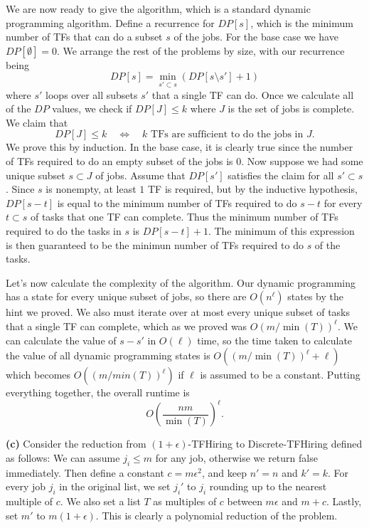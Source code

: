 \documentclass[11pt,letterpaper]{article}
\begin{document}
\begin{solution}
    We are now ready to give the algorithm, which is a standard dynamic programming algorithm. Define a recurrence for $DP[s]$, which is the minimum number of TFs that can do a subset $s$ of the jobs. For the base case we have $DP[\emptyset]=0$. We arrange the rest of the problems by size, with our recurrence being
    \[
        DP[s]=\min_{s'\subset s}(DP[s\setminus s']+1)
    \] 
    where $s'$ loops over all subsets $s'$ that a single TF can do. Once we calculate all of the $DP$ values, we check if $DP[J]\leq k$ where $J$ is the set of jobs is complete. We claim that 
    \[
        DP[J]\leq k \quad\Longleftrightarrow\quad k \textrm{ TFs are sufficient to do the jobs in } J.
    \] 
    We prove this by induction. In the base case, it is clearly true since the number of TFs required to do an empty subset of the jobs is $0$. Now suppose we had some unique subset $s\subset J$ of jobs. Assume that $DP[s']$ satisfies the claim for all $s'\subset s$. Since  $s$ is nonempty, at least $1$ TF is required, but by the inductive hypothesis, $DP[s-t]$ is equal to the minimum number of TFs required to do $s-t$ for every $t\subset s$ of tasks that one TF can complete. Thus the minimum number of TFs required to do the tasks in $s$ is $DP[s-t]+1$. The minimum of this expression is then guaranteed to be the minimun number of TFs required to do $s$ of the tasks.

    Let's now calculate the complexity of the algorithm. Our dynamic programming has a state for every unique subset of jobs, so there are $O(n^\ell)$ states by the hint we proved. We also must iterate over at most every unique subset of tasks that a single TF can complete, which as we proved was $O(m/\min(T))^\ell$. We can calculate the value of $s-s'$ in $O(\ell)$ time, so the time taken to calculate the value of all dynamic programming states is $O((m/\min(T))^\ell+\ell)$ which becomes $O((m/min(T))^\ell)$ if $\ell$ is assumed to be a constant. Putting everything together, the overall runtime is 
    \[
        O\left(\frac{nm}{\min(T)}\right)^\ell.
    \] 

    \textbf{(c)} Consider the reduction from $(1+\epsilon)$-\textsf{TFHiring} to \textsf{Discrete-TFHiring} defined as follows: We can assume $j_i\leq m$ for any job, otherwise we return false immediately. Then define a constant $c=m\epsilon^2$, and keep $n'=n$ and $k'=k$. For every job $j_i$ in the original list, we set $j_i'$ to $j_i$ rounding up to the nearest multiple of $c$. We also set a list $T$ as multiples of $c$ between $m\epsilon$ and $m+c$. Lastly, set $m'$ to $m(1+\epsilon)$. This is clearly a polynomial reduction of the problem.


\end{solution}
\end{document}
